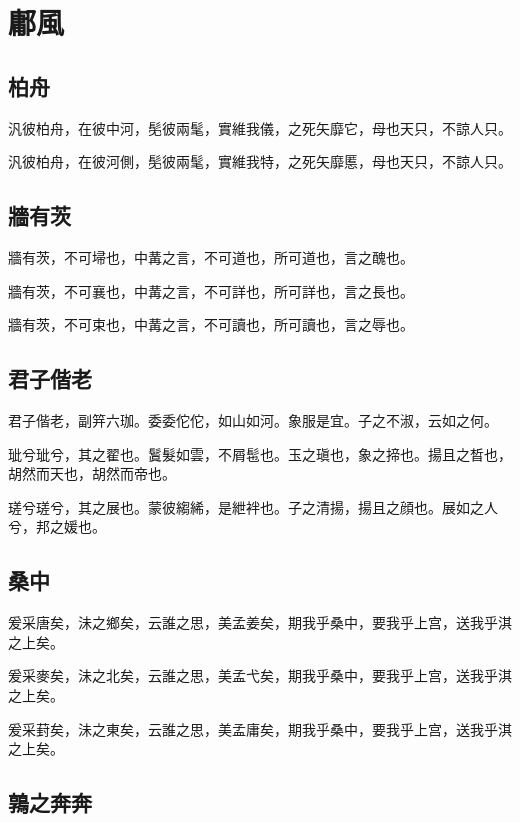 \section[鄘風]{鄘風}

\subsection[柏舟]{柏舟}

汎彼柏舟，在彼中河，髧彼兩髦，實維我儀，之死矢靡它，母也天只，不諒人只。

汎彼柏舟，在彼河側，髧彼兩髦，實維我特，之死矢靡慝，母也天只，不諒人只。

\subsection[牆有茨]{牆有茨}

牆有茨，不可埽也，中冓之言，不可道也，所可道也，言之醜也。

牆有茨，不可襄也，中冓之言，不可詳也，所可詳也，言之長也。

牆有茨，不可束也，中冓之言，不可讀也，所可讀也，言之辱也。

\subsection[君子偕老]{君子偕老}

君子偕老，副笄六珈。委委佗佗，如山如河。象服是宜。子之不淑，云如之何。

玼兮玼兮，其之翟也。鬒髮如雲，不屑髢也。玉之瑱也，象之揥也。揚且之晳也，胡然而天也，胡然而帝也。

瑳兮瑳兮，其之展也。蒙彼縐絺，是紲袢也。子之清揚，揚且之顔也。展如之人兮，邦之媛也。

\subsection[桑中]{桑中}

爰采唐矣，沬之鄉矣，云誰之思，美孟姜矣，期我乎桑中，要我乎上宫，送我乎淇之上矣。

爰采麥矣，沬之北矣，云誰之思，美孟弋矣，期我乎桑中，要我乎上宫，送我乎淇之上矣。

爰采葑矣，沬之東矣，云誰之思，美孟庸矣，期我乎桑中，要我乎上宫，送我乎淇之上矣。

\subsection[鶉之奔奔]{鶉之奔奔}

